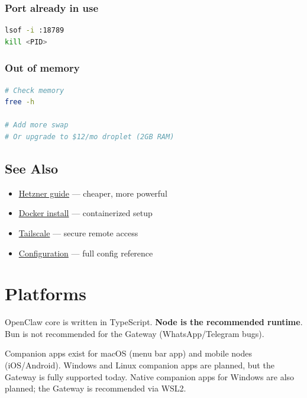 \subsubsection{Port already in use}


\begin{lstlisting}[language=bash]
lsof -i :18789
kill <PID>
\end{lstlisting}


\subsubsection{Out of memory}


\begin{lstlisting}[language=bash]
# Check memory
free -h

# Add more swap
# Or upgrade to $12/mo droplet (2GB RAM)
\end{lstlisting}


\hrulefill


\subsection{See Also}


\begin{itemize}
  \item \href{/install/hetzner}{Hetzner guide} — cheaper, more powerful
  \item \href{/install/docker}{Docker install} — containerized setup
  \item \href{/gateway/tailscale}{Tailscale} — secure remote access
  \item \href{/gateway/configuration}{Configuration} — full config reference
\end{itemize}



\clearpage

\section{Platforms}


OpenClaw core is written in TypeScript. \textbf{Node is the recommended runtime}.
Bun is not recommended for the Gateway (WhatsApp/Telegram bugs).

Companion apps exist for macOS (menu bar app) and mobile nodes (iOS/Android). Windows and
Linux companion apps are planned, but the Gateway is fully supported today.
Native companion apps for Windows are also planned; the Gateway is recommended via WSL2.

